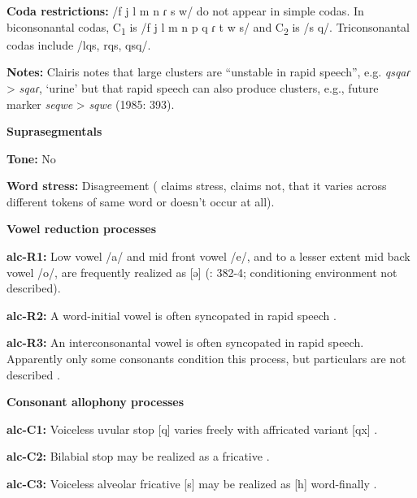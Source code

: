 \textbf{Coda restrictions:} /f j l m n ɾ s w/ do not appear in simple codas. In biconsonantal codas, C\textsubscript{1} is /f j l m n p q ɾ t w s/ and C\textsubscript{2} is /s q/. Triconsonantal codas include /lqs, rqs, qsq/.



\textbf{Notes:} Clairis notes that large clusters are “unstable in rapid speech”, e.g. \textit{qsqaɾ} > \textit{sqaɾ}, ‘urine’ but that rapid speech can also produce clusters, e.g., future marker \textit{seqwe} > \textit{sqwe} (1985: 393).



\textbf{Suprasegmentals}



\textbf{Tone:} No



\textbf{Word stress:} Disagreement (\citealt{Clairis1977} claims stress, \citealt{Clairis1985} claims not, that it varies across different tokens of same word or doesn’t occur at all).



\textbf{Vowel reduction processes}



\textbf{alc-R1:} Low vowel /a/ and mid front vowel /e/, and to a lesser extent mid back vowel /o/, are frequently realized as [ə] (\citealt{Clairis1985}: 382-4; conditioning environment not described).



\textbf{alc-R2:} A word-initial vowel is often syncopated in rapid speech \citep[393]{Clairis1985}.



\textbf{alc-R3:} An interconsonantal vowel is often syncopated in rapid speech. Apparently only some consonants condition this process, but particulars are not described \citep[393]{Clairis1985}.



\textbf{Consonant allophony processes}



\textbf{alc-C1:} Voiceless uvular stop [q] varies freely with affricated variant [qx] \citep[378]{Clairis1985}.



\textbf{alc-C2:}  Bilabial stop may be realized as a fricative \citep{Aguilera2001}.



\textbf{alc-C3:} Voiceless alveolar fricative [s] may be realized as [h] word-finally \citep[372]{Clairis1985}.



